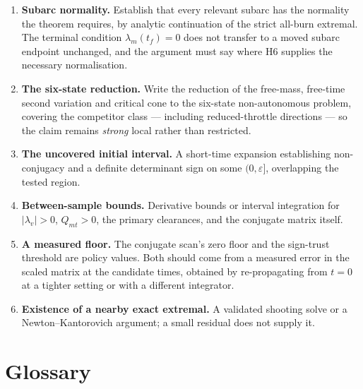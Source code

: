 \documentclass[11pt]{article}
\newcommand{\lv}{\lambda_v}\newcommand{\lr}{\lambda_r}\newcommand{\lm}{\lambda_m}
\newcommand{\tf}{t_f}\newcommand{\R}{\mathbb{R}}
\newcommand{\Qmt}{Q_{mt}}
\begin{document}
\begin{enumerate}
\item \textbf{Subarc normality.} Establish that every relevant subarc has the
normality the theorem requires, by analytic continuation of the strict all-burn
extremal. The terminal condition $\lm(\tf) = 0$ does not transfer to a moved
subarc endpoint unchanged, and the argument must say where H6 supplies the
necessary normalisation.

\item \textbf{The six-state reduction.} Write the reduction of the free-mass,
free-time second variation and critical cone to the six-state non-autonomous
problem, covering the competitor class --- including reduced-throttle
directions --- so the claim remains \emph{strong} local rather than restricted.

\item \textbf{The uncovered initial interval.} A short-time expansion
establishing non-conjugacy and a definite determinant sign on some
$(0, \varepsilon]$, overlapping the tested region.

\item \textbf{Between-sample bounds.} Derivative bounds or interval integration
for $|\lv| > 0$, $\Qmt > 0$, the primary clearances, and the conjugate matrix
itself.

\item \textbf{A measured floor.} The conjugate scan's zero floor and the
sign-trust threshold are policy values. Both should come from a measured error
in the scaled matrix at the candidate times, obtained by re-propagating from
$t = 0$ at a tighter setting or with a different integrator.

\item \textbf{Existence of a nearby exact extremal.} A validated shooting solve
or a Newton--Kantorovich argument; a small residual does not supply it.
\end{enumerate}

\section*{Glossary}
\end{document}
